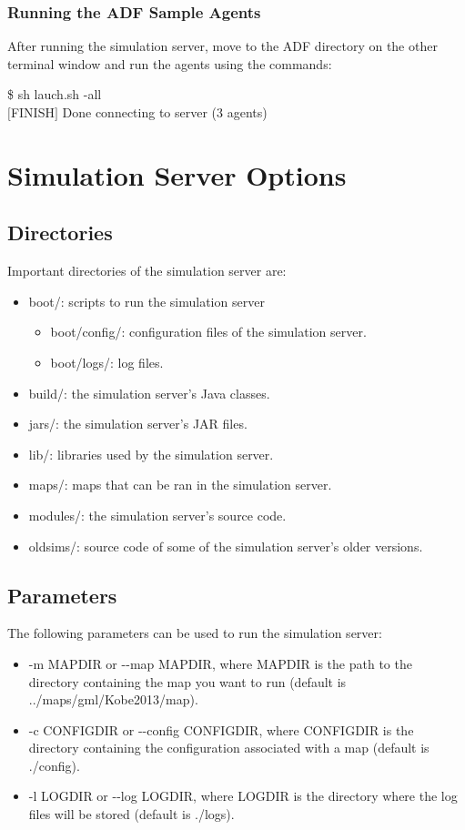 \documentclass[a4paper]{article}
\begin{document}
\subsubsection{Running the ADF Sample Agents}
After running the simulation server, move to the ADF directory on the other terminal window and run the agents using the commands:

\begin{center}
   \begin{tcolorbox}[title=Running Sample Agents, width=.98\linewidth]
    {\ttfamily
    \$ sh lauch.sh -all\\
    $[$FINISH$]$ Done connecting to server (3 agents)
    }
  \end{tcolorbox}
\end{center}

\section{Simulation Server Options}
\subsection{Directories}
Important directories of the simulation server are:
\begin{itemize}
 \item boot/: scripts to run the simulation server
       \begin{itemize}
	 \item boot/config/: configuration files of the simulation server.
	\item boot/logs/: log files.
       \end{itemize}
 \item build/: the simulation server's Java classes.
 \item jars/: the simulation server's JAR files.
 \item lib/: libraries used by the simulation server.
 \item maps/: maps that can be ran in the simulation server.
 \item modules/: the simulation server's source code.
 \item oldsims/: source code of some of the simulation server's older versions.
\end{itemize}
\subsection{Parameters}
The following parameters can be used to run the simulation server:
\begin{itemize}
 \item -m MAPDIR or {-}{-}map MAPDIR, where MAPDIR is the path to the directory containing the map you want to run (default is ../maps/gml/Kobe2013/map).
 \item -c CONFIGDIR or {-}{-}config CONFIGDIR, where CONFIGDIR is the directory containing the configuration associated with a map (default is ./config).
 \item -l LOGDIR or {-}{-}log LOGDIR, where LOGDIR is the directory where the log files will be stored (default is ./logs).
\end{itemize}
\end{document}
